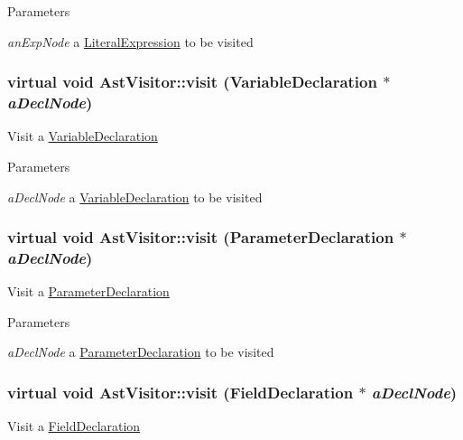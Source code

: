 \begin{DoxyParams}{Parameters}
\item[{\em anExpNode}]a \hyperlink{classLiteralExpression}{LiteralExpression} to be visited \end{DoxyParams}
\hypertarget{classAstVisitor_a7b11f0796ae296e3edc720de75a496c3}{
\subsubsection[{visit}]{\setlength{\rightskip}{0pt plus 5cm}virtual void AstVisitor::visit ({\bf VariableDeclaration} $\ast$ {\em aDeclNode})}}
\label{classAstVisitor_a7b11f0796ae296e3edc720de75a496c3}
Visit a \hyperlink{classVariableDeclaration}{VariableDeclaration}


\begin{DoxyParams}{Parameters}
\item[{\em aDeclNode}]a \hyperlink{classVariableDeclaration}{VariableDeclaration} to be visited \end{DoxyParams}
\hypertarget{classAstVisitor_a55c262f146345bdeb890ba032e08650a}{
\subsubsection[{visit}]{\setlength{\rightskip}{0pt plus 5cm}virtual void AstVisitor::visit ({\bf ParameterDeclaration} $\ast$ {\em aDeclNode})}}
\label{classAstVisitor_a55c262f146345bdeb890ba032e08650a}
Visit a \hyperlink{classParameterDeclaration}{ParameterDeclaration}


\begin{DoxyParams}{Parameters}
\item[{\em aDeclNode}]a \hyperlink{classParameterDeclaration}{ParameterDeclaration} to be visited \end{DoxyParams}
\hypertarget{classAstVisitor_a15ca20c155aa1b3c67c983dc9ecf10a7}{
\subsubsection[{visit}]{\setlength{\rightskip}{0pt plus 5cm}virtual void AstVisitor::visit ({\bf FieldDeclaration} $\ast$ {\em aDeclNode})}}
\label{classAstVisitor_a15ca20c155aa1b3c67c983dc9ecf10a7}
Visit a \hyperlink{classFieldDeclaration}{FieldDeclaration}


